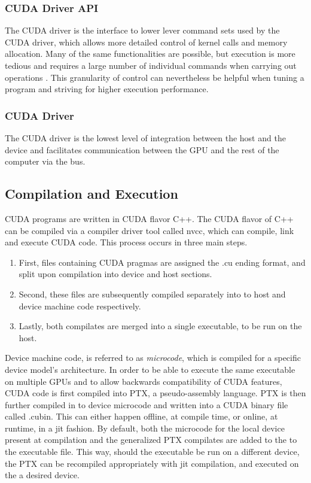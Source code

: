 \subsubsection{CUDA Driver API}
The CUDA driver is the interface to lower lever command sets used by the CUDA driver, which allows more detailed control
of kernel calls and memory allocation. Many of the same functionalities are possible,
but execution is more tedious and requires a large number of individual commands
when carrying out operations \cite{driver}. This granularity of control can nevertheless be
helpful when tuning a program and striving for higher execution performance.
\subsubsection{CUDA Driver}

The CUDA driver is the lowest level of integration between the host and the device
and facilitates communication between the \Gls{GPU} and the rest of the computer via the bus. %


\subsection{Compilation and Execution}


CUDA programs are written in CUDA flavor C++.  The CUDA flavor of C++
can be compiled via a compiler driver tool called nvcc, which can compile, link and execute CUDA code.  This process occurs
 in three main steps.
 \begin{enumerate}

\item First,
files containing CUDA pragmas are assigned the .cu ending format, and split upon
compilation into device and host sections.
\item Second, these files are subsequently
compiled separately into to host and device machine code respectively.
\item Lastly, both compilates are merged into a single executable, to be run on the host.
\end{enumerate}
\par
Device machine code, is referred to as  \textit{microcode},
which is compiled for a specific device model's architecture. In order to be able
to execute the same executable
on multiple \Glspl{GPU} and to allow backwards compatibility of CUDA features, CUDA code is
first compiled into \Gls{PTX}, a pseudo-assembly language.  \Gls{PTX} is then
further compiled in to device microcode and written into a CUDA binary file called .cubin.
This can either happen offline, at compile time,
or online, at runtime, in a \gls{jit} fashion.  By default, both
the microcode for the local device present at compilation and the generalized
\gls{PTX} compilates are added to the to the executable file.
This way, should the executable be run on a different device, the \gls{PTX} can
be recompiled appropriately with \Gls{jit} compilation, and executed on the a
desired device\cite{Wilt}.

